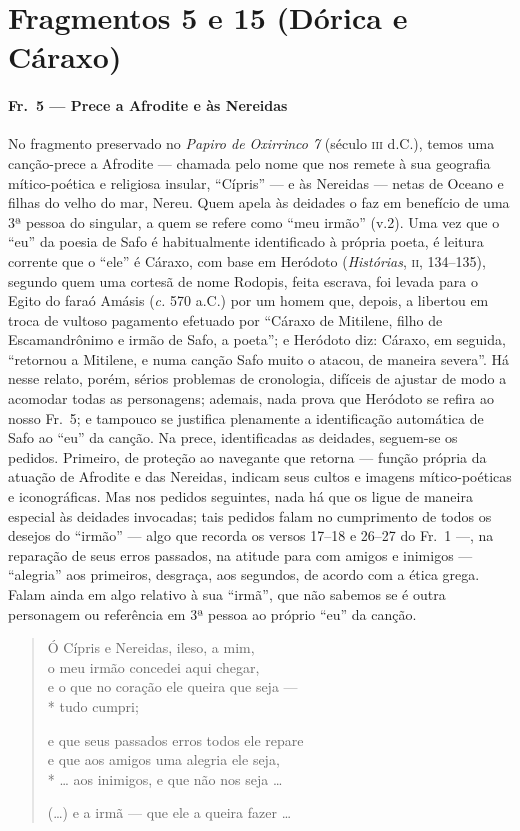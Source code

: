 \section{Fragmentos 5 e 15 (Dórica e Cáraxo)}

\paragraph{Fr.~5 --- Prece a Afrodite e às Nereidas}

{\small No fragmento preservado no \textit{Papiro de Oxirrinco 7} (século \textsc{iii} d.C.),
temos uma canção-prece a Afrodite --- chamada pelo nome que nos remete à sua
geografia mítico-poética e religiosa insular, “Cípris” --- e às Nereidas
--- netas de Oceano e filhas do velho do mar, Nereu. Quem apela às deidades o faz
em benefício de uma 3ª pessoa do singular, a quem se refere como “meu
irmão” (v.2). Uma vez que o “eu” da poesia de Safo é habitualmente
identificado à própria poeta, é leitura corrente que o “ele” é Cáraxo, com base
em Heródoto (\textit{Histórias}, \textsc{ii}, 134--135), segundo quem uma
cortesã de nome Rodopis, feita escrava, foi levada para o Egito do faraó Amásis
(\textit{c.} 570 a.C.) por um homem que, depois, a libertou em troca de vultoso
pagamento efetuado por “Cáraxo de Mitilene, filho de Escamandrônimo e
irmão de Safo, a poeta”; e Heródoto diz: Cáraxo, em seguida, “retornou
a Mitilene, e numa canção Safo muito o atacou, de maneira severa”. Há nesse
relato, porém, sérios problemas de cronologia, difíceis de ajustar de modo a
acomodar todas as personagens; ademais, nada prova que Heródoto se refira ao
nosso Fr.~5; e tampouco se justifica plenamente a identificação automática de
Safo ao “eu” da canção. Na prece, identificadas as deidades, seguem-se os
pedidos. Primeiro, de proteção ao navegante que retorna --- função própria da
atuação de Afrodite e das Nereidas, indicam seus cultos e imagens
mítico-poéticas e iconográficas. Mas nos pedidos seguintes, nada há que os
ligue de maneira especial às deidades invocadas; tais pedidos falam no
cumprimento de todos os desejos do “irmão” --- algo que recorda os
versos 17--18 e 26--27 do Fr.~1 ---, na reparação de seus erros passados, na
atitude para com amigos e inimigos --- “alegria” aos primeiros,
desgraça, aos segundos, de acordo com a ética grega. Falam ainda em algo
relativo à sua ``irmã'', que não sabemos se é outra personagem ou
referência em 3ª pessoa ao próprio “eu” da canção.}

\begin{verse}
Ó Cípris e Nereidas, ileso, a mim,\\
o meu irmão concedei aqui chegar,\\
e o que no coração ele queira que seja ---\\*
tudo cumpri;

e que seus passados erros todos ele repare\\
e que aos amigos uma alegria ele seja,\\*
\ldots{} aos inimigos, e que não nos seja \ldots{}

(\ldots{}) e a irmã --- que ele a queira fazer \ldots{}
\end{verse}

